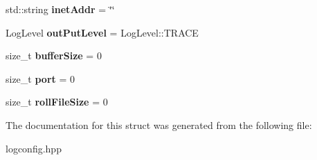 \begin{DoxyCompactItemize}
std\+::string {\bfseries inet\+Addr} = \char`\"{}\char`\"{}
\item 
\mbox{\label{structLogConfigStruct_ab08a68607def9ef7fa152ce6f93b5255}} 
Log\+Level {\bfseries out\+Put\+Level} = Log\+Level\+::\+T\+R\+A\+CE
\item 
\mbox{\label{structLogConfigStruct_ae912bd4277da08a6e5ef98d883edfe5c}} 
size\+\_\+t {\bfseries buffer\+Size} = 0
\item 
\mbox{\label{structLogConfigStruct_a3bb39839737253d2ca8fee671d6774c8}} 
size\+\_\+t {\bfseries port} = 0
\item 
\mbox{\label{structLogConfigStruct_a1cc2b960107ddbc827f8b1dce2b9ece5}} 
size\+\_\+t {\bfseries roll\+File\+Size} = 0
\end{DoxyCompactItemize}


The documentation for this struct was generated from the following file\+:\begin{DoxyCompactItemize}
\item 
logconfig.\+hpp\end{DoxyCompactItemize}
